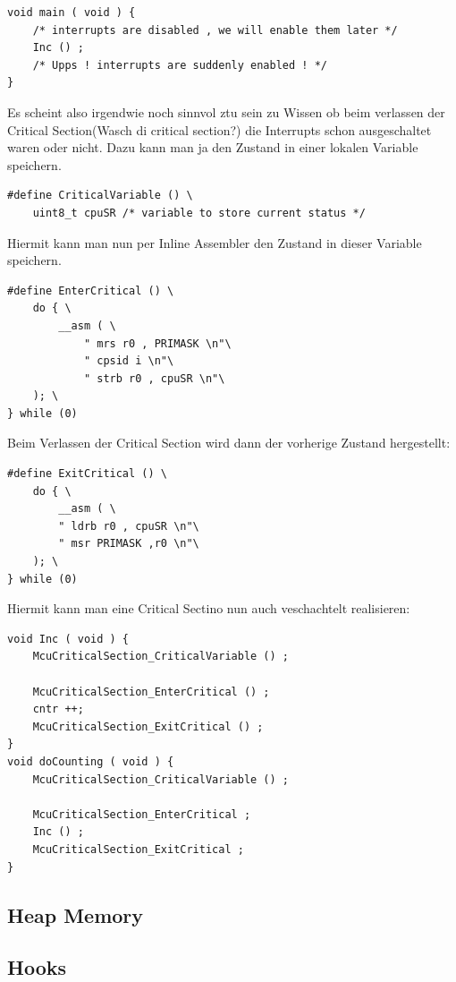 \documentclass[a4paper, 8pt]{extarticle}
\begin{document}
\begin{multicols*}{3}
\begin{description}
\begin{lstlisting}
void main ( void ) {
	/* interrupts are disabled , we will enable them later */
	Inc () ;
	/* Upps ! interrupts are suddenly enabled ! */
}
								\end{lstlisting}
								Es scheint also irgendwie noch sinnvol ztu sein zu Wissen ob beim verlassen der Critical Section(Wasch di critical section?)
								die Interrupts schon ausgeschaltet waren oder nicht. Dazu kann man ja den Zustand in einer lokalen Variable speichern.
								\begin{lstlisting}
#define CriticalVariable () \
	uint8_t cpuSR /* variable to store current status */
								\end{lstlisting}
								Hiermit kann man nun per Inline Assembler den Zustand in dieser Variable speichern.
								\begin{lstlisting}
#define EnterCritical () \
	do { \
		__asm ( \
			" mrs r0 , PRIMASK \n"\
			" cpsid i \n"\
			" strb r0 , cpuSR \n"\
	); \
} while (0)
								\end{lstlisting}
								Beim Verlassen der Critical Section wird dann der vorherige Zustand hergestellt:
								\begin{lstlisting}
#define ExitCritical () \
	do { \
		__asm ( \
		" ldrb r0 , cpuSR \n"\
		" msr PRIMASK ,r0 \n"\
	); \
} while (0)
								\end{lstlisting}
								Hiermit kann man eine Critical Sectino nun auch veschachtelt realisieren:
								\begin{lstlisting}
void Inc ( void ) {
	McuCriticalSection_CriticalVariable () ;

	McuCriticalSection_EnterCritical () ;
	cntr ++;
	McuCriticalSection_ExitCritical () ;
}
void doCounting ( void ) {
	McuCriticalSection_CriticalVariable () ;
	
	McuCriticalSection_EnterCritical ;
	Inc () ;
	McuCriticalSection_ExitCritical ;
}

								\end{lstlisting}
					\end{description}

				\subsection{Heap Memory}
				\subsection{Hooks}

\end{multicols*}
\end{document}

